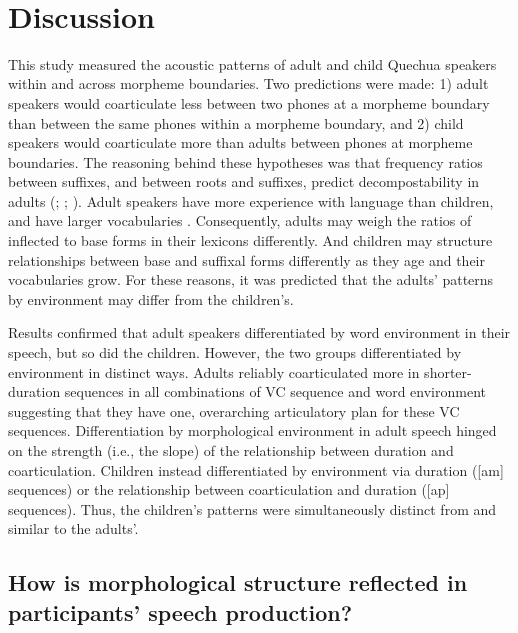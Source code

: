 \documentclass[a4paper,man,floatsintext,natbib,donotrepeattitle, apacite]{apa6}
\begin{document}
~
~

\section{Discussion}

This study measured the acoustic patterns of adult and child Quechua speakers within and across morpheme boundaries. Two predictions were made: 1) adult speakers would coarticulate less between two phones at a morpheme boundary than between the same phones within a morpheme boundary, and 2) child speakers would coarticulate more than adults between phones at morpheme boundaries. The reasoning behind these hypotheses was that frequency ratios between suffixes, and between roots and suffixes, predict decompostability in adults (\citealt{hayCausesConsequencesWord2003}; \citealt{kempsProsodicCuesMorphological2005}; \citealt{ingoplagSuffixOrderingMorphological2009}). Adult speakers have more experience with language than children, and have larger vocabularies \citep{lorgeEstimatingSizeVocabularies1963}. Consequently, adults may weigh the ratios of inflected to base forms in their lexicons differently. And children may structure relationships between base and suffixal forms differently as they age and their vocabularies grow. For these reasons, it was predicted that the adults' patterns by environment may differ from the children's. 

Results confirmed that adult speakers differentiated by word environment in their speech, but so did the children. However, the two groups differentiated by environment in distinct ways. Adults reliably coarticulated more in shorter-duration sequences in all combinations of VC sequence and word environment suggesting that they have one, overarching articulatory plan for these VC sequences. Differentiation by morphological environment in adult speech hinged on the strength (i.e., the slope) of the relationship between duration and coarticulation. Children instead differentiated by environment via duration ([am] sequences) or the relationship between coarticulation and duration ([ap] sequences). Thus, the children's patterns were simultaneously distinct from and similar to the adults'. 

\subsection{How is morphological structure reflected in participants' speech production?}
\end{document}
